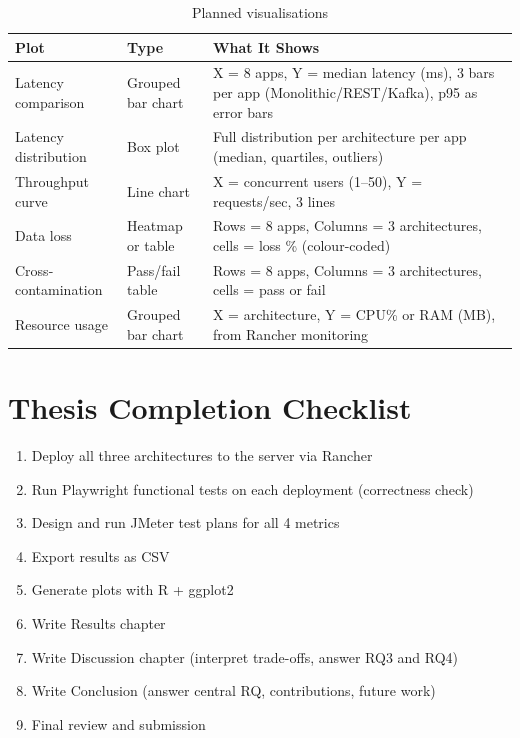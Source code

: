\documentclass[12pt,a4paper]{article}
\begin{document}
\begin{table}[h]
\centering
\small
\begin{tabular}{@{}llp{7cm}@{}}
\toprule
\textbf{Plot} & \textbf{Type} & \textbf{What It Shows} \\
\midrule
Latency comparison & Grouped bar chart & X = 8 apps, Y = median latency (ms), 3 bars per app (Monolithic/REST/Kafka), p95 as error bars \\
Latency distribution & Box plot & Full distribution per architecture per app (median, quartiles, outliers) \\
Throughput curve & Line chart & X = concurrent users (1--50), Y = requests/sec, 3 lines \\
Data loss & Heatmap or table & Rows = 8 apps, Columns = 3 architectures, cells = loss \% (colour-coded) \\
Cross-contamination & Pass/fail table & Rows = 8 apps, Columns = 3 architectures, cells = pass or fail \\
Resource usage & Grouped bar chart & X = architecture, Y = CPU\% or RAM (MB), from Rancher monitoring \\
\bottomrule
\end{tabular}
\caption{Planned visualisations}
\end{table}

\section{Thesis Completion Checklist}

\begin{enumerate}
  \item[$\square$] Deploy all three architectures to the server via Rancher
  \item[$\square$] Run Playwright functional tests on each deployment (correctness check)
  \item[$\square$] Design and run JMeter test plans for all 4 metrics
  \item[$\square$] Export results as CSV
  \item[$\square$] Generate plots with R + ggplot2
  \item[$\square$] Write Results chapter
  \item[$\square$] Write Discussion chapter (interpret trade-offs, answer RQ3 and RQ4)
  \item[$\square$] Write Conclusion (answer central RQ, contributions, future work)
  \item[$\square$] Final review and submission
\end{enumerate}
\end{document}
